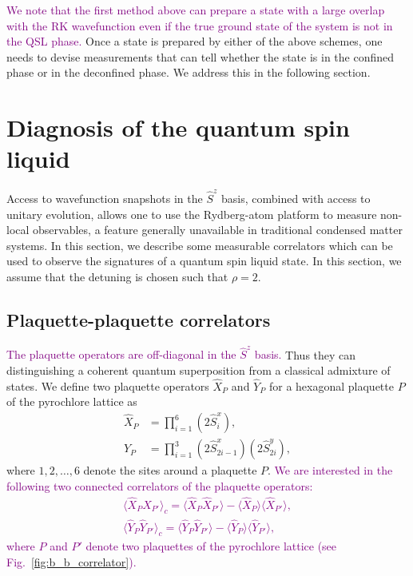 \documentclass[twocolumn,superscriptaddress,amsmath,amssymb,aps,prx,nofootinbib]{revtex4-2}
\newcommand{\newtext}[1]{\textcolor{purple}{#1}}
\begin{document}
\newtext{We note that the first method above can prepare a state with a large overlap with the RK wavefunction even if the true ground state of the system is not in the QSL phase.}
Once a state is prepared by either of the above schemes, one needs to devise measurements that can tell whether the state is in the confined phase or in the deconfined phase. We address this in the following section.

\section{Diagnosis of the quantum spin liquid}\label{sec:diagnostics}
Access to wavefunction snapshots in the $\hat{S}^z$ basis, combined with access to unitary evolution, allows one to use the Rydberg-atom platform to measure non-local observables, a feature generally unavailable in traditional condensed matter systems. In this section, we describe some measurable correlators which can be used to observe the signatures of a quantum spin liquid state. In this section, we  assume that the detuning is chosen such that $\rho = 2$.



\subsection{Plaquette-plaquette correlators}

 \newtext{The plaquette operators are  off-diagonal in the $\hat{S}^z$ basis.} Thus they can distinguishing a coherent quantum superposition from a classical admixture of states. We define two plaquette operators $\hat{X}_P$ and $\hat{Y}_P$ for a hexagonal plaquette $P$ of the pyrochlore lattice as 
 \begin{equation} \label{eq:xp_yp_def}
  \begin{aligned}
    \hat{X}_{P} &=  \prod_{i =1}^{6} \left( 2\hat{S}_i^x \right) ,\\
    \hat{Y}_{P} & = \prod_{i = 1}^{3} \left( 2\hat{S}_{2i-1}^x \right) \left( 2\hat{S}_{2i}^y \right),
\end{aligned}
\end{equation}
where $1,2,\ldots,6$ denote the sites around a plaquette $P$. \newtext{We are interested in the following two connected correlators of the plaquette operators:
\begin{equation}
\begin{aligned}
\label{eq:conn_corr_x_y}
    \langle \hat{X}_{P} \hat{X}_{P'} \rangle_c = \langle \hat{X}_P \hat{X}_{P'} \rangle - \langle \hat{X}_P \rangle \langle \hat{X}_{P'} \rangle,\\
    \langle \hat{Y}_P \hat{Y}_{P'} \rangle_c = \langle \hat{Y}_P \hat{Y}_{P'} \rangle - \langle \hat{Y}_P  \rangle \langle  \hat{Y}_{P'} \rangle,
\end{aligned}
\end{equation}
where $P$ and $P'$ denote two plaquettes of the pyrochlore lattice (see Fig.~\ref{fig:b_b_correlator}).
}
\end{document}
